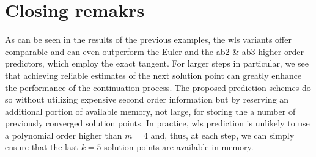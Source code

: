 \section{Closing remakrs}

As can be seen in the results of the previous examples, the \acrshort{wls} 
variants offer comparable and can even outperform the Euler and the 
\acrshort{ab2} \& \acrshort{ab3} 
higher order predictors, which employ the exact tangent. For larger steps in 
particular, we see that achieving reliable estimates of the next solution point 
can greatly enhance the performance of the continuation process. The proposed 
prediction schemes do so without utilizing expensive second order information 
but by reserving an additional portion of available memory, not large, for 
storing the a number of previously converged solution points. In practice, 
\acrshort{wls} prediction is unlikely to use a polynomial order higher than 
$m=4$ and, thus, at each step, we can simply ensure that the last $k=5$ 
solution points are available in memory. 
